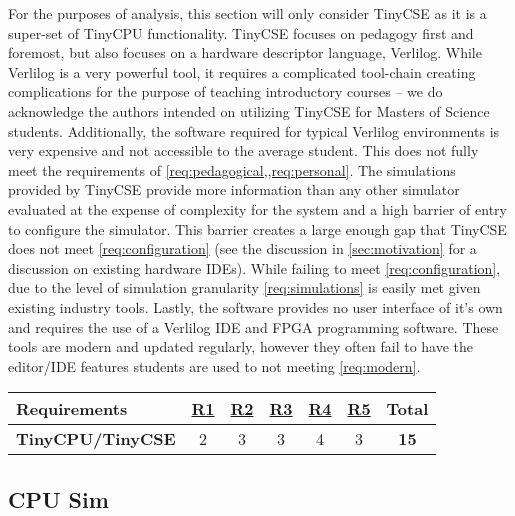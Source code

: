 For the purposes of analysis, this section will only consider TinyCSE as it is a super-set of TinyCPU functionality. TinyCSE focuses on pedagogy first and foremost, but also focuses on a hardware descriptor language, Verlilog. While Verlilog is a very powerful tool, it requires a complicated tool-chain creating complications for the purpose of teaching introductory courses -- we do acknowledge the authors intended on utilizing TinyCSE for Masters of Science students. Additionally, the software required for typical Verlilog environments is very expensive and not accessible to the average student. This does not fully meet the requirements of \cref{req:pedagogical,,req:personal}. The simulations provided by TinyCSE provide more information than any other simulator evaluated at the expense of complexity for the system and a high barrier of entry to configure the simulator. This barrier creates a large enough gap that TinyCSE does not meet \cref{req:configuration} (see the discussion in \cref{sec:motivation} for a discussion on existing hardware IDEs). While failing to meet \cref{req:configuration}, due to the level of simulation granularity \cref{req:simulations} is easily met given existing industry tools. Lastly, the software provides no user interface of it's own and requires the use of a Verlilog IDE and FPGA programming software. These tools are modern and updated regularly, however they often fail to have the editor/IDE features students are used to not meeting \cref{req:modern}.

\begin{table}[h!]
    \centering
    \begin{tabular}{lcccccc}
        \textbf{Requirements} & \textbf{\hyperref[req:personal]{R1}} & \textbf{\hyperref[req:configuration]{R2}} & \textbf{\hyperref[req:pedagogical]{R3}} & \textbf{\hyperref[req:simulations]{R4}} & \textbf{\hyperref[req:modern]{R5}} & \textbf{Total} \\ \hline
        \textbf{TinyCPU/TinyCSE \cite{Nakamura2013, McLoughlin2010}} 
        & 2 & 3 & 3 & 4 & 3 & \textbf{15} \\ 
    \end{tabular}
\end{table}

\subsection{CPU Sim}
\label{sec:review-cpu-sim}

